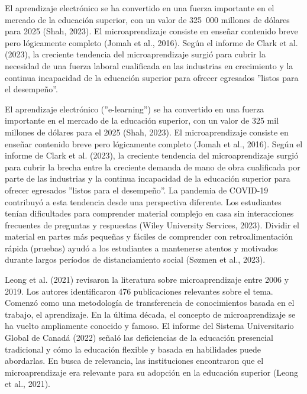 
El aprendizaje electrónico se ha convertido en una fuerza importante en el
mercado de la educación superior, con un valor de 325 000 millones de dólares
para 2025 (Shah, 2023). El microaprendizaje consiste en enseñar contenido breve
pero lógicamente completo (Jomah et al., 2016). Según el informe de Clark et al.
(2023), la creciente tendencia del microaprendizaje surgió para cubrir la
necesidad de una fuerza laboral cualificada en las industrias en crecimiento y
la continua incapacidad de la educación superior para ofrecer egresados
''listos para el desempeño''.

El aprendizaje electrónico (''e-learning'') se ha convertido en una fuerza importante en el
mercado de la educación superior, con un valor de 325 mil millones de dólares
para el 2025 (Shah, 2023). El microaprendizaje consiste en enseñar contenido breve
pero lógicamente completo (Jomah et al., 2016). Según el informe de Clark et al.
(2023), la creciente tendencia del microaprendizaje surgió para cubrir la brecha
entre la creciente demanda de mano de obra cualificada por parte de las
industrias y la continua incapacidad de la educación superior para ofrecer
egresados ''listos para el desempeño''. La pandemia de COVID-19 contribuyó a
esta tendencia desde una perspectiva diferente. Los estudiantes tenían
dificultades para comprender material complejo en casa sin interacciones
frecuentes de preguntas y respuestas (Wiley University Services, 2023). Dividir
el material en partes más pequeñas y fáciles de comprender con retroalimentación
rápida (pruebas) ayudó a los estudiantes a mantenerse atentos y motivados
durante largos períodos de distanciamiento social (Søzmen et al., 2023).

Leong et al. (2021) revisaron la literatura sobre microaprendizaje entre 2006 y
2019. Los autores identificaron 476 publicaciones relevantes sobre el tema.
Comenzó como una metodología de transferencia de conocimientos basada en el
trabajo, el aprendizaje. En la última década, el concepto de microaprendizaje se
ha vuelto ampliamente conocido y famoso. El informe del Sistema Universitario
Global de Canadá (2022) señaló las deficiencias de la educación presencial
tradicional y cómo la educación flexible y basada en habilidades puede
abordarlas. En busca de relevancia, las instituciones encontraron que el
microaprendizaje era relevante para su adopción en la educación superior (Leong
et al., 2021).

